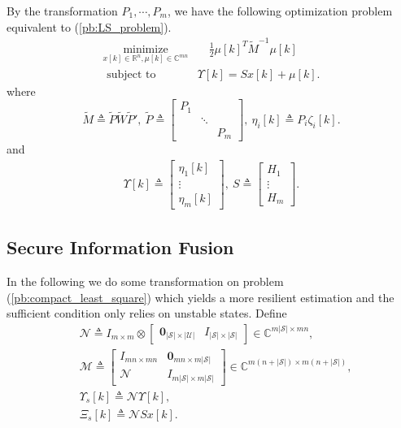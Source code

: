 \documentclass[12pt]{article}
\newcommand{\Rb}{{\mathbb{R}}}
\newcommand{\Cb}{{\mathbb{C}}}
\newcommand{\Uc}{{\mathcal{U}}}
\newcommand{\Sc}{{\mathcal{S}}}
\newcommand{\Mc}{{\mathcal{M}}}
\newcommand{\Nc}{{\mathcal{N}}}
\begin{document}
By the transformation $P_1,\cdots,P_m$, we have the following optimization problem equivalent to (\ref{pb:LS_problem}).
\begin{subequations}\label{pb:compact_least_square}
	\begin{align}
		\underset{{x}[k]\in \Rb^n, \mu[k]\in\Cb^{mn}}{\text{minimize}}&\quad \frac{1}{2} \mu[k]^{T} \tilde{M}^{-1} \mu[k]   \\
		\text { subject to }\quad&
		\Upsilon [k]=
		S x[k]+\mu[k] .  
	\end{align}
\end{subequations}
where 
\begin{equation}
	\tilde{M}\triangleq\tilde{P}\tilde{W}\tilde{P}{'},\
	\tilde{P} \triangleq\left[\begin{array}{ccc}
		P_1 & & \\
		& \ddots & \\
		& & P_m
	\end{array}\right],\
\eta_i[k]\triangleq P_i\zeta_{i}[k].
\end{equation}
and
\begin{align}
	\Upsilon [k]\triangleq
	\begin{bmatrix}
		\eta_{1}[k] \\
		\vdots \\
		\eta_{m}[k]
	\end{bmatrix}, \
	S\triangleq\begin{bmatrix}
		H_{1} \\
		\vdots \\
		H_{m}
	\end{bmatrix} .	
\end{align}


\subsection{Secure Information Fusion}

In the following we do some transformation on problem (\ref{pb:compact_least_square}) which yields a more resilient estimation and the sufficient condition only relies on unstable states.
Define 
\begin{align*}
	&\Nc\triangleq
	I_{m\times m} \otimes 
	\begin{bmatrix}
		\mathbf{0}_{|\Sc|\times|\Uc|} & I_{|\Sc|\times|\Sc|}
	\end{bmatrix}
	\in \Cb^{m|\Sc|\times mn },
	\\
	&\Mc\triangleq
	\begin{bmatrix}
		I_{mn\times mn} & \mathbf{0}_{mn\times m|\Sc|} \\ 
		\Nc		
		& I_{m|\Sc|\times m|\Sc|} 
	\end{bmatrix}
	\in \Cb^{m(n+|\Sc|)\times m(n+|\Sc|) },
	\\
	&\Upsilon_s[k] \triangleq\Nc\Upsilon [k], \\
	&\Xi_s[k] \triangleq\Nc S x[k].
\end{align*}
\end{document}
